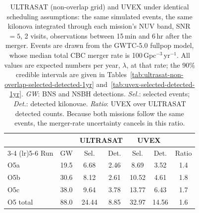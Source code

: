 \begin{table}[!htb]
\centering
\renewcommand\arraystretch{1.15}
\setlength{\tabcolsep}{0.14cm}
\caption{ULTRASAT (non-overlap grid) and UVEX under identical scheduling
assumptions: the same simulated events, the same kilonova integrated through
each mission's NUV band, SNR\,$=5$, 2 visits, observations between
15\,min and 6\,hr after the merger. Events are
drawn from the GWTC-5.0 fullpop model, whose median total CBC merger rate is
100\,$\mathrm{Gpc^{-3}\,yr^{-1}}$. All values are expected numbers
per year, $\lambda$, at that rate; the 90\% credible intervals are given in
Tables~\ref{tab:ultrasat-non-overlap-selected-detected-1yr}
and~\ref{tab:uvex-selected-detected-1yr}. \emph{GW}: BNS and NSBH detections.
\emph{Sel.}: selected events; \emph{Det.}: detected kilonovae.
\emph{Ratio}: UVEX over ULTRASAT detected counts. Because both missions follow
the same events, the merger-rate uncertainty cancels in this ratio.}
\label{tab:mission-comparison}
\begin{tabular}{lcccccc}
\toprule
 & & \multicolumn{2}{c}{ULTRASAT} & \multicolumn{2}{c}{UVEX} & \\
\cmidrule(lr){3-4} \cmidrule(lr){5-6}
Run & GW & Sel. & Det. & Sel. & Det. & Ratio \\
\midrule
O5a & 19.5 & 6.68 & 2.46 & 8.69 & 3.52 & 1.4 \\
O5b & 30.6 & 8.12 & 2.61 & 10.52 & 4.61 & 1.8 \\
O5c & 38.0 & 9.64 & 3.78 & 13.77 & 6.43 & 1.7 \\
\midrule
O5 total & 88.0 & 24.44 & 8.85 & 32.97 & 14.56 & 1.6 \\
\bottomrule
\end{tabular}
\end{table}
